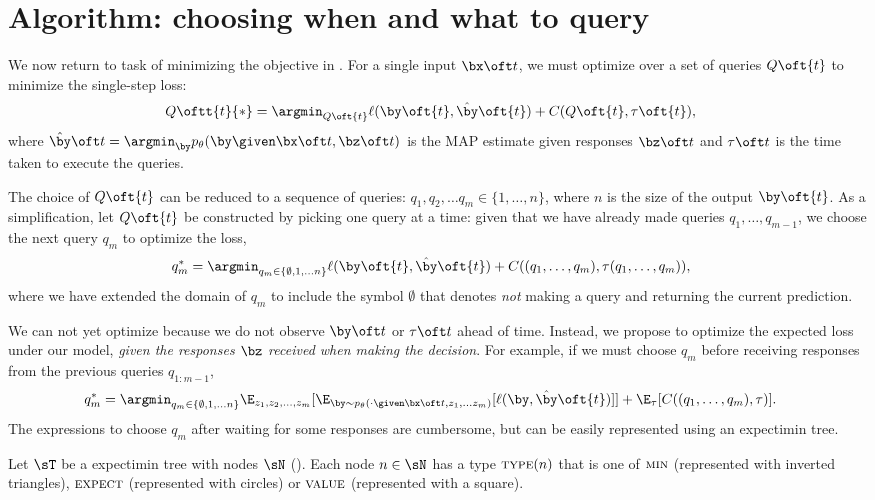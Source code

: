 \section{Algorithm: choosing when and what to query}
\label{sec:async}

We now return to task of minimizing the objective in .
For a single input $\bx\oft t$, we must optimize over a set of queries $Q\oft{t}$ to minimize the single-step loss:
\begin{align*}
  Q\oftt{t}{*} &= \argmin_{Q\oft{t}} \ell(\by\oft{t}, \byt\oft{t}) + C(Q\oft{t}, \tau\oft{t}),
\end{align*}
where $\byt\oft t = \argmin_{\by} \p(\by \given \bx \oft t, \bz\oft t)$ is the MAP estimate given responses $\bz\oft t$ and $\tau\oft t$ is the time taken to execute the queries.

The choice of $Q\oft{t}$ can be reduced to a sequence of queries: $q_1, q_2, \ldots q_m \in \{1, \ldots, n\}$, where $n$ is the size of the output $\by\oft{t}$.
As a simplification, let $Q\oft{t}$ be constructed by picking one query at a time:
given that we have already made queries $q_1, \ldots, q_{m-1}$, we choose the next query $q_m$ to optimize the loss,
\begin{align}
  q_m^* &= \argmin_{q_m \in \{\emptyset, 1, \ldots n\}} \ell(\by\oft{t}, \byt\oft{t}) + C((q_1, \ldots, q_m), \tau(q_1, \ldots, q_m)), \label{eqn:one-step-q}
\end{align}
where we have extended the domain of $q_m$ to include the symbol $\emptyset$ that denotes {\em not\/} making a query and returning the current prediction.

We can not yet optimize  because we do not observe $\by\oft t$ or $\tau\oft t$ ahead of time.
Instead, we propose to optimize the expected loss under our model, {\em given the responses $\bz$ received when making the decision}.
For example, if we must choose $q_m$ before receiving responses from the previous queries $q_{1:m-1}$,  
\begin{align*}
  q_m^* &= \argmin_{q_m \in \{\emptyset, 1, \ldots n\}} 
  \E_{z_1, z_2, \ldots, z_{m}}[\E_{\by \sim \p(\cdot \given \bx\oft t, z_1, \ldots z_m)}[\ell(\by, \byt\oft{t})]] + \E_{\tau}[C((q_1, \ldots, q_m), \tau)].
\end{align*}
The expressions to choose $q_m$ after waiting for some responses are cumbersome, but can be easily represented using an expectimin tree.

Let $\sT$ be a expectimin tree with nodes $\sN$ ().
Each node $n \in \sN$ has a type $\operatorname{\textsc{type}}(n)$ that is one of $\textsc{min}$ (represented with inverted triangles), $\textsc{expect}$ (represented with circles) or $\textsc{value}$ (represented with a square).

